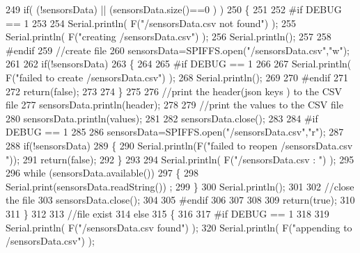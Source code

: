 \begin{DoxyCode}
249     \textcolor{keywordflow}{if}( (!sensorsData) || (sensorsData.size()==0 ) )
250     \{
251     
252 \textcolor{preprocessor}{    #if DEBUG == 1}
253     
254         Serial.println( F(\textcolor{stringliteral}{"/sensorsData.csv not found"}) );
255         Serial.println( F(\textcolor{stringliteral}{"creating /sensorsData.csv"}) );
256         Serial.println();
257     
258 \textcolor{preprocessor}{    #endif}
259         \textcolor{comment}{//create file}
260         sensorsData=SPIFFS.open(\textcolor{stringliteral}{"/sensorsData.csv"},\textcolor{stringliteral}{"w"});
261         
262         \textcolor{keywordflow}{if}(!sensorsData)
263         \{
264 
265 \textcolor{preprocessor}{        #if DEBUG == 1}
266         
267             Serial.println( F(\textcolor{stringliteral}{"failed to create /sensorsData.csv"}) );
268             Serial.println();
269         
270 \textcolor{preprocessor}{        #endif}
271         
272             \textcolor{keywordflow}{return}(\textcolor{keyword}{false});
273 
274         \}
275         
276         \textcolor{comment}{//print the header(json keys ) to the CSV file}
277         sensorsData.println(header);
278 
279         \textcolor{comment}{//print the values to the CSV file}
280         sensorsData.println(values);
281         
282         sensorsData.close();
283     
284 \textcolor{preprocessor}{    #if DEBUG == 1}
285 
286         sensorsData=SPIFFS.open(\textcolor{stringliteral}{"/sensorsData.csv"},\textcolor{stringliteral}{"r"});
287         
288         \textcolor{keywordflow}{if}(!sensorsData)
289         \{
290             Serial.println(F(\textcolor{stringliteral}{"failed to reopen /sensorsData.csv "}));
291             \textcolor{keywordflow}{return}(\textcolor{keyword}{false});      
292         \}
293 
294         Serial.println( F(\textcolor{stringliteral}{"/sensorsData.csv : "}) );
295 
296         \textcolor{keywordflow}{while} (sensorsData.available()) 
297         \{
298             Serial.print(sensorsData.readString()) ;
299         \}
300         Serial.println();
301 
302         \textcolor{comment}{//close the file}
303         sensorsData.close();
304 
305 \textcolor{preprocessor}{    #endif}
306         
307 
308         
309         \textcolor{keywordflow}{return}(\textcolor{keyword}{true});
310         
311     \}
312 
313     \textcolor{comment}{//file exist}
314     \textcolor{keywordflow}{else}
315     \{
316 
317 \textcolor{preprocessor}{    #if DEBUG == 1}
318     
319         Serial.println( F(\textcolor{stringliteral}{"/sensorsData.csv  found"}) );
320         Serial.println( F(\textcolor{stringliteral}{"appending to /sensorsData.csv"}) );

\end{DoxyCode}
